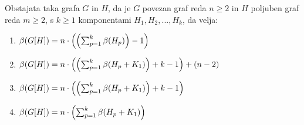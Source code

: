 \documentclass[mat1, tisk]{fmfdelo}
\newcommand{\1}{(1, 1, ..., 1)}
\newcommand{\2}{(2, 2, ..., 2)}
\begin{document}
    \begin{izrek} \label{izrek:primeri_mdim_komp}
    Obstajata taka grafa $G$ in $H$, da je $G$ povezan graf reda $n \geq 2$ in $H$ poljuben graf 
    reda $m \geq 2$, s $k \geq 1$ komponentami $H_1, H_2, ... , H_k$, da velja:
    \begin{enumerate}
        \item $\beta(G[H]) = n \cdot \Bigl ( \Bigl ( \sum_{p=1}^{k} \beta(H_p) \Bigr )  - 1  \Bigr )$
        \item $\beta(G[H]) = n \cdot \Bigl ( \Bigl ( \sum_{p=1}^{k} \beta(H_p + K_1) \Bigr ) + k - 1 
         \Bigr ) + (n-2)$
        \item $\beta(G[H]) = n \cdot \Bigl ( \Bigl ( \sum_{p=1}^{k} \beta(H_p + K_1) \Bigr ) + k - 1  
        \Bigr )$
        \item $\beta(G[H]) = n \cdot \Bigl ( \sum_{p=1}^{k} \beta(H_p + K_1) \Bigr ) $
    \end{enumerate}
    \end{izrek}
    
\end{document}
